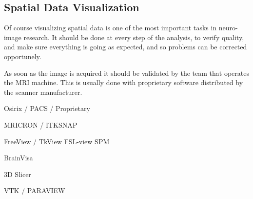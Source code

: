 \subsection{Spatial Data Visualization}

Of course visualizing spatial data is one of the most important tasks in neuro-image research. It should be done at every step of the analysis, to verify quality, and make sure everything is going as expected, and so problems can be corrected opportunely.

As soon as the image is acquired it should be validated by the team that operates the MRI machine. This is usually done with proprietary software distributed by the scanner manufacturer. 

Osirix / PACS / Proprietary \autocite{rosset_osirix:_2004}

MRICRON / ITKSNAP

FreeView / TkView \autocite{fischl_freesurfer_2012}
FSL-view \autocite{jenkinson_fsl_2012}
SPM \autocite{friston_statistical_2006}

BrainVisa \autocite{cointepas_brainvisa:_2001}

3D Slicer \autocite{fedorov_3d_2012}

VTK / PARAVIEW \autocite{schroeder_design_1996} \autocite{ahrens_paraview:_2005}










